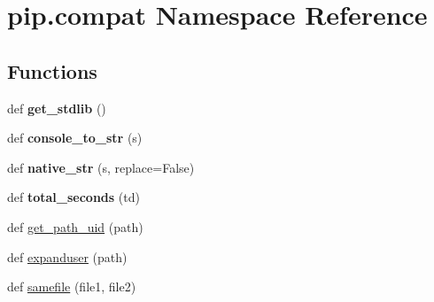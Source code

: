 \hypertarget{namespacepip_1_1compat}{}\section{pip.\+compat Namespace Reference}
\label{namespacepip_1_1compat}
\subsection*{Functions}
\begin{DoxyCompactItemize}
\item 
\mbox{\label{namespacepip_1_1compat_af0d20fba4f705800d8102243cdc5090a}} 
def {\bfseries get\+\_\+stdlib} ()
\item 
\mbox{\label{namespacepip_1_1compat_a17331f6b189d0d032bd9d6363996bc2b}} 
def {\bfseries console\+\_\+to\+\_\+str} (s)
\item 
\mbox{\label{namespacepip_1_1compat_a0dafaf88b2029846650d7eec6b2ed0aa}} 
def {\bfseries native\+\_\+str} (s, replace=False)
\item 
\mbox{\label{namespacepip_1_1compat_a9d12eab4510ace82241780d7d538f367}} 
def {\bfseries total\+\_\+seconds} (td)
\item 
def \hyperlink{namespacepip_1_1compat_a1239985da93ed3cf6f017c0d234c1bd2}{get\+\_\+path\+\_\+uid} (path)
\item 
def \hyperlink{namespacepip_1_1compat_a5e0a7eada370641692bafb5d19cd08a2}{expanduser} (path)
\item 
def \hyperlink{namespacepip_1_1compat_a73d4f009414127d4821c2ce3f7c362ae}{samefile} (file1, file2)
\end{DoxyCompactItemize}
